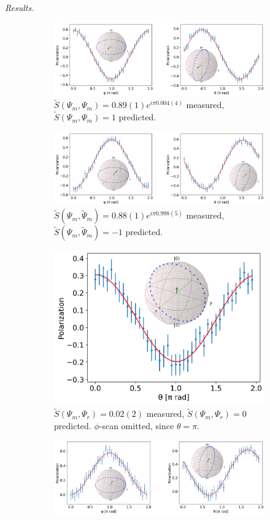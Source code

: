 \documentclass[a4paper,twocolumn,11pt, accepted=2024-06-14]{quantumarticle}
\begin{document}
\emph{Results.}
\begin{figure}
    \centering
    \begin{subfigure}{\textwidth}
        \centering
        \includegraphics[width=0.7\linewidth]{Figures/flav_s_plus.pdf}
        \caption{$\tilde{S}(\Psi_m, \Psi_m) = 0.89(1) e^{i\pi 0.004(4)}$ measured, $\tilde S(\Psi_m, \Psi_m) = 1$ predicted.}
        \label{fig:flav_cond_res_plus}
    \end{subfigure}
        \begin{subfigure}{\textwidth}
        \centering
        \includegraphics[width=0.7\linewidth]{Figures/flav_s_minus.pdf}
        \caption{$\tilde{S}(\Psi_m, \tilde{\Psi}_m) = 0.88(1)e^{i\pi 0.998(5)}$ measured, $\tilde S(\Psi_m, \tilde{\Psi}_m) = -1$ predicted.}
        \label{fig:flav_cond_res_minus}
    \end{subfigure}
    \begin{subfigure}{\textwidth}
        \centering
        \includegraphics[width=0.35\linewidth]{Figures/flav_s_zero.pdf}
        \caption{$\tilde{S}(\Psi_m, \Psi_r) = 0.02(2)$ measured, $\tilde S(\Psi_m, \Psi_r) = 0$ predicted. $\phi$-scan omitted, since $\theta=\pi$.}
        \label{fig:flav_cond_res_zero}
    \end{subfigure}
        \begin{subfigure}{\textwidth}
     \centering
        \includegraphics[width=0.7\linewidth]{Figures/exist_s_minus.pdf}

\end{subfigure}
\end{figure}
\end{document}
